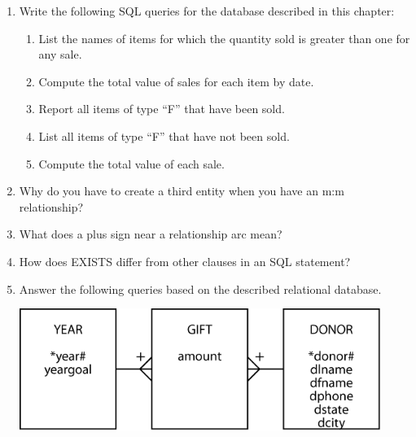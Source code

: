 \documentclass[
]{article}
\begin{document}
\begin{enumerate}
\def\labelenumi{\arabic{enumi}.}
\setcounter{enumi}{2}
\item
  Write the following SQL queries for the database described in this
  chapter:

  \begin{enumerate}
  \def\labelenumii{\alph{enumii}.}
  \item
    List the names of items for which the quantity sold is greater than
    one for any sale.
  \item
    Compute the total value of sales for each item by date.
  \item
    Report all items of type ``F'' that have been sold.
  \item
    List all items of type ``F'' that have not been sold.
  \item
    Compute the total value of each sale.
  \end{enumerate}
\item
  Why do you have to create a third entity when you have an m:m
  relationship?
\item
  What does a plus sign near a relationship arc mean?
\item
  How does EXISTS differ from other clauses in an SQL statement?
\item
  Answer the following queries based on the described relational
  database.

  \includegraphics[width=4.61458in,height=\textheight]{Figures/Chapter 5/gift.png}


\end{enumerate}
\end{document}
